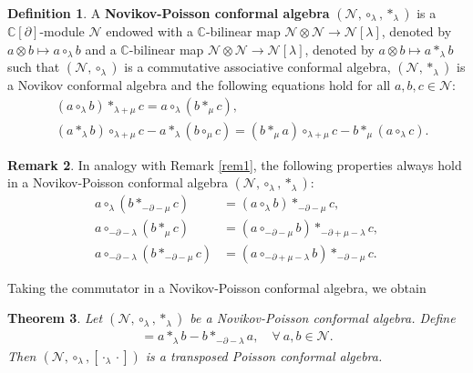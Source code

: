 \documentclass[11pt,letterpaper,reqno]{amsart}
\newtheorem{theorem}{Theorem}[section]
\theoremstyle{definition}
\newtheorem{definition}[theorem]{Definition}
\newtheorem{remark}[theorem]{Remark}
\numberwithin{equation}{section}
\begin{document}
\begin{definition}
   A {\textbf{Novikov-Poisson conformal algebra}} $(\mathcal{N},\circ_{\lambda},\ast_{\lambda})$ is a $\mathbb{C}[\partial]$-module $\mathcal{N}$ endowed with a $\mathbb{C}$-bilinear map $\mathcal{N}  \otimes \mathcal{N}  \rightarrow \mathcal{N} [\lambda]$, denoted by $a\otimes b\mapsto a \circ_{\lambda}b$ and a $\mathbb{C}$-bilinear map $\mathcal{N}  \otimes \mathcal{N}  \rightarrow \mathcal{N} [\lambda]$,
   denoted by $a\otimes b\mapsto a\ast_\lambda b$ such that $(\mathcal{N} ,\circ_\lambda)$ is a {commutative associative conformal algebra}, $(\mathcal{N} ,\ast_\lambda)$ is a {Novikov conformal algebra} and the following equations hold for all $a,b,c \in \mathcal{N}$:
   \begin{align}
      &(a\circ_\lambda b)\ast_{\lambda+\mu}c=a\circ_\lambda(b\ast_\mu c), \label{f7}\\
      &(a\ast_\lambda b)\circ_{\lambda+\mu}c-a\ast_\lambda(b\circ_\mu c)=(b\ast_\mu a)\circ_{\lambda+\mu}c-b\ast_\mu(a\circ_\lambda c). \label{h8}
   \end{align}
\end{definition}

\begin{remark}\label{rem2}
   In analogy with Remark \ref{rem1}, the following properties always hold in a Novikov-Poisson conformal algebra $(\mathcal{N},\circ_{\lambda},\ast_{\lambda})$:
   \begin{align*}
         a\circ_{\lambda}(b\ast_{-\partial-\mu}c) & =(a\circ_{\lambda}b)\ast_{-\partial-\mu}c, \\
         a\circ_{-\partial-\lambda}(b\ast_{\mu}c) & =(a\circ_{-\partial-\mu}b)\ast_{-\partial+\mu-\lambda}c, \\
         a\circ_{-\partial-\lambda}(b\ast_{-\partial-\mu}c) & =(a\circ_{-\partial+\mu-\lambda}b)\ast_{-\partial-\mu}c.
   \end{align*}
\end{remark}

Taking the commutator in a Novikov-Poisson conformal algebra, we obtain
\begin{theorem}\label{The1.2}
   Let $(\mathcal{N} ,\circ_\lambda,\ast_\lambda)$ be a Novikov-Poisson conformal algebra. Define
   \begin{align}
      [a_{\lambda}b]=a\ast_{\lambda} b-b\ast_{-\partial-\lambda} a, \quad \forall ~a,b \in \mathcal{N}.
   \end{align}
Then $(\mathcal{N} ,\circ_\lambda,[\cdot_\lambda\cdot])$ is a transposed Poisson conformal algebra.
\end{theorem}
\end{document}
